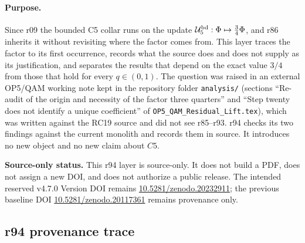 \paragraph{Purpose.}
Since r09 the bounded C5 collar runs on the update
\(\mathcal U_5^{\rm bd}:\Phi\mapsto\tfrac34\Phi\), and r86 inherits it without revisiting
where the factor comes from.  This layer traces the factor to its first occurrence, records
what the source does and does not supply as its justification, and separates the results that
depend on the exact value \(3/4\) from those that hold for every \(q\in(0,1)\).  The question
was raised in an external OP5/QAM working note kept in the repository folder
\texttt{analysis/} (sections ``Re-audit of the origin and necessity of the factor three
quarters'' and ``Step twenty does not identify a unique coefficient'' of
\texttt{OP5\_QAM\_Residual\_Lift.tex}), which was written against the RC19 source and did not
see r85--r93.  r94 checks its two findings against the current monolith and records them in
source.  It introduces no new object and no new claim about \(C5\).

\noindent\textbf{Source-only status.}
This r94 layer is source-only.  It does not build a PDF, does not assign a new DOI,
and does not authorize a public release.  The intended reserved v4.7.0 Version DOI remains
\href{https://doi.org/10.5281/zenodo.20232911}{10.5281/zenodo.20232911}; the previous
baseline DOI \href{https://doi.org/10.5281/zenodo.20117361}{10.5281/zenodo.20117361}
remains provenance only.

\subsection*{r94 provenance trace}
\label{subsec:r94-provenance-trace}

